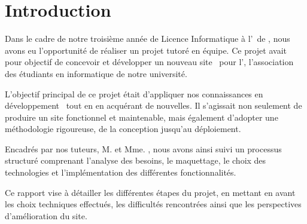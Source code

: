 \chapter{Introduction}
\label{chap:intro}

Dans le cadre de notre troisième année de Licence Informatique à l’\univ\ de , nous avons eu l’opportunité de réaliser un projet tutoré en équipe. Ce projet avait pour objectif de concevoir et développer un nouveau site \web\ pour l’\ofni\@ , l’association des étudiants en informatique de notre université.
\bigskip

L’objectif principal de ce projet était d’appliquer nos connaissances en développement \web\ tout en en acquérant de nouvelles. Il s’agissait non seulement de produire un site fonctionnel et maintenable, mais également d’adopter une méthodologie rigoureuse, de la conception jusqu’au déploiement.

Encadrés par nos tuteurs, M.  et Mme. , nous avons ainsi suivi un processus structuré comprenant l’analyse des besoins, le maquettage, le choix des technologies et l’implémentation des différentes fonctionnalités.
\bigskip

Ce rapport vise à détailler les différentes étapes du projet, en mettant en avant les choix techniques effectués, les difficultés rencontrées ainsi que les perspectives d’amélioration du site.
